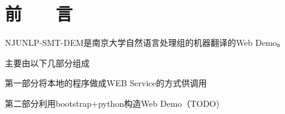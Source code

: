 
\chapter*{\hfill 前　　言 \hfill}
\label{chap00}

NJUNLP-SMT-DEM是南京大学自然语言处理组的机器翻译的Web Demo。

主要由以下几部分组成

第一部分将本地的程序做成WEB Service的方式供调用

第二部分利用bootstrap+python构造Web Demo（TODO)